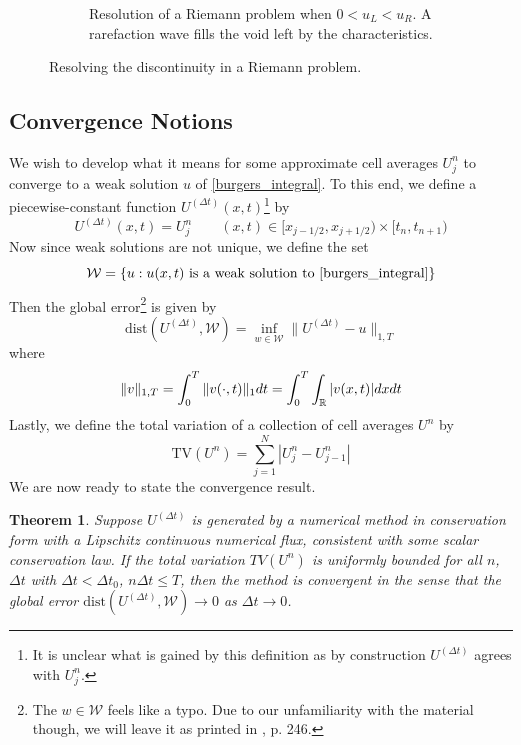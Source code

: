 \documentclass{myproject}
\newtheorem{theorem}{Theorem}
\begin{document}
\begin{figure}
\begin{subfigure}{.48\textwidth}
        \caption{Resolution of a Riemann problem when $0<u_L<u_R$. A rarefaction wave fills the void left by the characteristics.}
        \label{fig:rarefaction}
    \end{subfigure}
    \caption{Resolving the discontinuity in a Riemann problem.}
    \label{fig:riemann_discontinuities}
\end{figure}

\subsection{Convergence Notions}

We wish to develop what it means for some approximate cell averages $U_j^n$ to converge to a weak solution $u$ of \eqref{burgers_integral}. To this end, we define a piecewise-constant function $U^{(\Delta t)}(x,t)$\footnote{It is unclear what is gained by this definition as by construction $U^{(\Delta t)}$ agrees with $U_j^n$.} by
\begin{equation}
    U^{(\Delta t)}(x,t) = U_j^n \qquad (x,t) \in [x_{j-1/2}, x_{j+1/2}) \times [t_n, t_{n+1})
\end{equation}
Now since weak solutions are not unique, we define the set
\begin{equation}
    \mathcal{W} = \{u : u(x,t) \text{ is a weak solution to \eqref{burgers_integral}}\}
\end{equation}
Then the global error\footnote{The $w \in \mathcal{W}$ feels like a typo. Due to our unfamiliarity with the material though, we will leave it as printed in \cite{leveque2002}, p. 246.} is given by
\begin{equation}
    \text{dist}\left(U^{(\Delta t)}, \mathcal{W}\right) = \inf_{w \in \mathcal{W}} \| U^{(\Delta t)} - u \|_{1,T}
\end{equation}
where 
\begin{equation}
    \|v\|_{1,T} = \int_{0}^{T} \|v(\cdot,t)\|_1dt = \int_{0}^{T}\int_{\operatorname{\mathbb{R}}}|v(x,t)|dx dt
\end{equation}
Lastly, we define the total variation of a collection of cell averages $U^n$ by 
\begin{equation}
    \text{TV}(U^n) = \sum_{j=1}^N |U_j^n - U_{j-1}^n|
\end{equation}
We are now ready to state the convergence result.
\begin{theorem}
    Suppose $U^{(\Delta t)}$ is generated by a numerical method in conservation form with a Lipschitz continuous numerical flux, consistent with some scalar conservation law. If the total variation $TV(U^n)$ is uniformly bounded for all $n$, $\Delta t$ with $\Delta t < \Delta t_0$, $n \Delta t \leq T$, then the method is convergent in the sense that the global error $\text{dist}\left(U^{(\Delta t)}, \mathcal{W}\right) \to 0$ as $\Delta t \to 0$.
\end{theorem}
\end{document}
